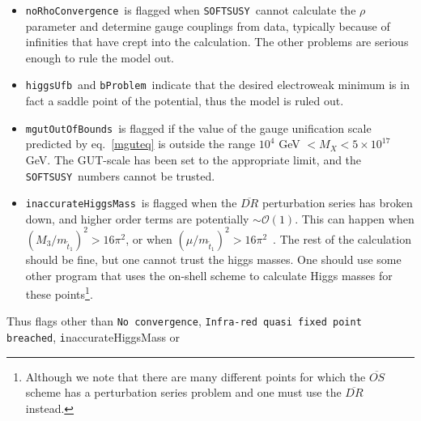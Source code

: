 \documentclass{article}
\def\SOFTSUSY{{\tt SOFTSUSY}}
\def\code#1{\small{\tt #1}\normalsize}
\begin{document}
\begin{itemize}
other quantities (including the $Z-$boson mass) and fix gauge and Yukawa
couplings, it is possible that the numerical predictions are somewhat
inaccurate (\SOFTSUSY will use almost zero masses for these tachyons).
So: the model is not necessarily ruled out, and the flag results in a warning.
are used in loops to calculate 
\code{tachyon} is of an enumerated type \code{tachyonType}, which relabels the
integers $z \in (0,\ 17)$ to indicate which particle is a tachyon according to
the rule
\begin{eqnarray}
0&=&\mbox{no tachyon},\ 1=\tilde e,\ 2=\tilde \mu,\ 3=\tilde \tau,\ 
4=\tilde u,\ 5=\tilde c,\ 6=\tilde c,\ 7=\tilde d,\ 
8=\tilde s, \nonumber \\
9&=&{\tilde b},\ 10=h^0,\ 11=A^0,\ 12=H^\pm,\ 13={\tilde \nu}_e,\
14={\tilde \nu}_\mu,\ 15={\tilde \nu}_\tau,\ 16=W^\pm,\ 17=Z^0\nonumber
\end{eqnarray}
respectively.
\item
\code{noRhoConvergence}~is flagged when \SOFTSUSY~cannot calculate the $\rho$
parameter and determine gauge couplings from data, typically because of
infinities that have crept into the calculation. The other
problems are serious enough to rule the model out.
\item
\code{higgsUfb}~and \code{bProblem}~indicate that the desired electroweak minimum is in fact a
saddle point of the potential, thus the model is ruled out.
\item
\code{mgutOutOfBounds}~is flagged if the value of the gauge unification scale
predicted by eq.~\ref{mguteq}
is outside the range $10^4$ GeV $< M_X < 5 \times 10^{17}$ GeV. The GUT-scale
has been set to the appropriate limit, and the \SOFTSUSY~numbers cannot be
trusted. 
\item
\code{inaccurateHiggsMass}~is flagged when the $\overline{DR}$ perturbation
series has broken down, and higher order terms are potentially $\sim
\mathcal{O}(1)$. This can happen when $(M_3/m_{{\tilde t}_1})^2>16 \pi^2$, or
when 
$(\mu/m_{{\tilde t}_1})^2>16 \pi^2$~\cite{Degrassi:2001yf}. The rest of the calculation should be fine,
but one cannot trust the higgs masses. One should use some other program that
uses the on-shell scheme to calculate Higgs masses for these
points\footnote{Although we note that there are many different points for
  which the 
$\overline{OS}$ scheme has a perturbation series problem and one must use
the  $\overline{DR}$ instead.}.
\end{itemize}
Thus flags other than \code{No convergence}, \code{Infra-red quasi fixed point
  breached}, {\code inaccurateHiggsMass} or
\end{document}
